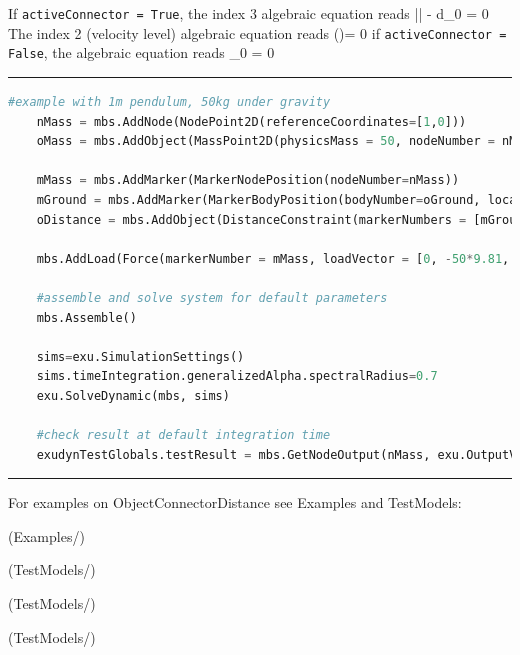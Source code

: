     If \texttt{activeConnector = True}, the index 3 algebraic equation reads
    \be
      \left|\right| - d_0 = 0
    \ee
    The index 2 (velocity level) algebraic equation reads
    \be
      \left(\right)\tp \Delta\vv = 0
    \ee
    if \texttt{activeConnector = False}, the algebraic equation reads
    \be
      \lambda_0 = 0
    \ee
\vspace{6pt}\par\noindent\rule{\textwidth}{0.4pt}
\label{miniExample_ObjectConnectorDistance}
\pythonstyle
\begin{lstlisting}[language=Python, firstnumber=1]
    #example with 1m pendulum, 50kg under gravity
    nMass = mbs.AddNode(NodePoint2D(referenceCoordinates=[1,0]))
    oMass = mbs.AddObject(MassPoint2D(physicsMass = 50, nodeNumber = nMass))
    
    mMass = mbs.AddMarker(MarkerNodePosition(nodeNumber=nMass))
    mGround = mbs.AddMarker(MarkerBodyPosition(bodyNumber=oGround, localPosition = [0,0,0]))
    oDistance = mbs.AddObject(DistanceConstraint(markerNumbers = [mGround, mMass], distance = 1))
    
    mbs.AddLoad(Force(markerNumber = mMass, loadVector = [0, -50*9.81, 0])) 

    #assemble and solve system for default parameters
    mbs.Assemble()
    
    sims=exu.SimulationSettings()
    sims.timeIntegration.generalizedAlpha.spectralRadius=0.7
    exu.SolveDynamic(mbs, sims)

    #check result at default integration time
    exudynTestGlobals.testResult = mbs.GetNodeOutput(nMass, exu.OutputVariableType.Position)[0]

\end{lstlisting}

\vspace{6pt}\par\noindent\rule{\textwidth}{0.4pt}
%
\noindent For examples on ObjectConnectorDistance see Examples and TestModels:
\bi
\item {} (Examples/)
\item {} (TestModels/)
\item {} (TestModels/)
\item {} (TestModels/)
\ei

